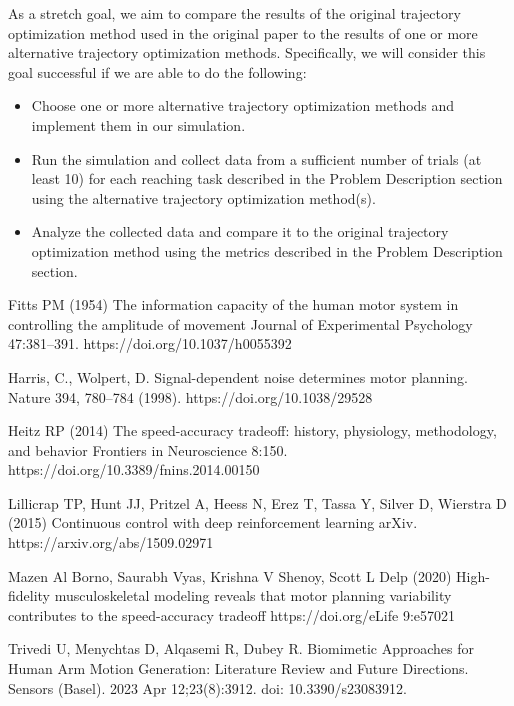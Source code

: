 \documentclass[table,12pt]{article}
\begin{document}
As a stretch goal, we aim to compare the results of the original trajectory optimization method used in the original paper to the results of one or more alternative trajectory optimization methods. Specifically, we will consider this goal successful if we are able to do the following:
\begin{itemize}
    \item Choose one or more alternative trajectory optimization methods and implement them in our simulation.
    \item Run the simulation and collect data from a sufficient number of trials (at least 10) for each reaching task described in the Problem Description section using the alternative trajectory optimization method(s).
    \item Analyze the collected data and compare it to the original trajectory optimization method using the metrics described in the Problem Description section.
\end{itemize}

\begin{thebibliography}{99}
Fitts PM (1954) The information capacity of the human motor system in controlling the amplitude of movement Journal of Experimental Psychology 47:381–391. https://doi.org/10.1037/h0055392 

Harris, C., Wolpert, D. Signal-dependent noise determines motor planning. Nature 394, 780–784 (1998). https://doi.org/10.1038/29528

Heitz RP (2014) The speed-accuracy tradeoff: history, physiology, methodology, and behavior Frontiers in Neuroscience 8:150. https://doi.org/10.3389/fnins.2014.00150

Lillicrap TP, Hunt JJ, Pritzel A, Heess N, Erez T, Tassa Y, Silver D, Wierstra D (2015) Continuous control with deep reinforcement learning arXiv. https://arxiv.org/abs/1509.02971

Mazen Al Borno, Saurabh Vyas, Krishna V Shenoy, Scott L Delp (2020) High-fidelity musculoskeletal modeling reveals that motor planning variability contributes to the speed-accuracy tradeoff 
https://doi.org/eLife 9:e57021

Trivedi U, Menychtas D, Alqasemi R, Dubey R. Biomimetic Approaches for Human Arm Motion Generation: Literature Review and Future Directions. Sensors (Basel). 2023 Apr 12;23(8):3912. doi: 10.3390/s23083912.
\end{thebibliography}
\end{document}
